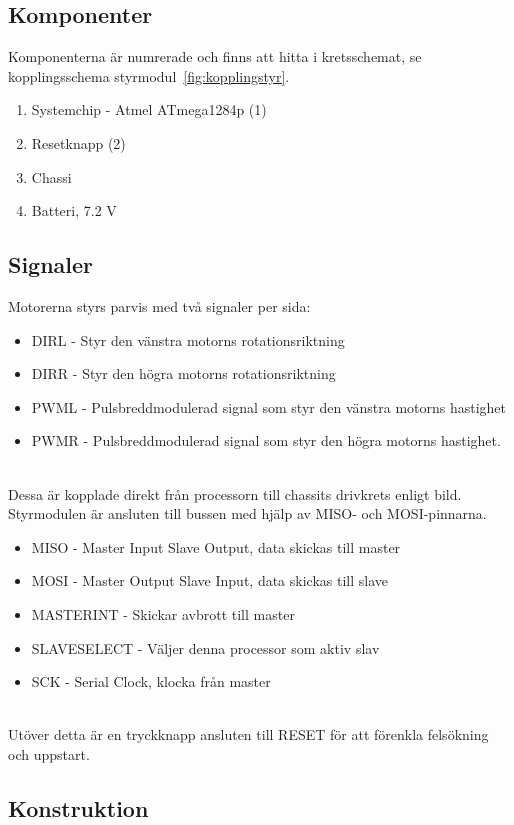 \documentclass[a4paper,12pt,fleqn]{article}
\begin{document}

\subsection{Komponenter}
Komponenterna är numrerade och finns att hitta i kretsschemat, se kopplingsschema styrmodul~\ref{fig:kopplingstyr}.
\begin{enumerate}
	\item Systemchip - Atmel ATmega1284p (1)
	\item Resetknapp (2)
	\item Chassi
	\item Batteri, 7.2 V
\end{enumerate}
\subsection{Signaler}
Motorerna styrs parvis med två signaler per sida:
\begin{itemize}
	\item DIRL - Styr den vänstra motorns rotationsriktning
	\item DIRR - Styr den högra motorns rotationsriktning
	\item PWML - Pulsbreddmodulerad signal som styr den vänstra motorns hastighet
	\item PWMR - Pulsbreddmodulerad signal som styr den högra motorns hastighet.
\end{itemize}
~\\
Dessa är kopplade direkt från processorn till chassits drivkrets enligt bild.
Styrmodulen är ansluten till bussen med hjälp av MISO- och MOSI-pinnarna.

\begin{itemize}
	\item MISO - Master Input Slave Output, data skickas till master
	\item MOSI - Master Output Slave Input, data skickas till slave
	\item MASTERINT - Skickar avbrott till master
	\item SLAVESELECT - Väljer denna processor som aktiv slav
	\item SCK - Serial Clock, klocka från master
\end{itemize}
~\\
Utöver detta är en tryckknapp ansluten till RESET för att förenkla felsökning och uppstart. 

\newpage
\subsection{Konstruktion}
\end{document}
